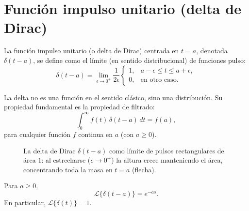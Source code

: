 \section{Función impulso unitario (delta de Dirac)}

\begin{definition}
La función impulso unitario (o delta de Dirac) centrada en $t=a$, denotada $\delta(t-a)$, se define como el límite (en sentido distribucional) de funciones pulso:
\[
\delta(t-a) = \lim_{\epsilon\to0^+} \frac{1}{2\epsilon}
\begin{cases}
1, & a-\epsilon \le t \le a+\epsilon,\\
0, & \text{en otro caso}.
\end{cases}
\]
\end{definition}

\begin{rem}
La delta no es una función en el sentido clásico, sino una distribución. Su propiedad fundamental es la propiedad de filtrado:
\[
\int_0^\infty f(t)\,\delta(t-a)\,dt = f(a),
\]
para cualquier función $f$ continua en $a$ (con $a\ge0$).
\end{rem}

\begin{figure}[!htbp]
\centering
{}
\caption{La delta de Dirac $\delta(t-a)$ como límite de pulsos rectangulares de área $1$: al estrecharse ($\epsilon\to0^+$) la altura crece manteniendo el área, concentrando toda la masa en $t=a$ (flecha).}
\label{fig:dirac}
\end{figure}

\begin{theorem}
Para $a\ge0$,
\[
\mathcal{L}\{\delta(t-a)\} = e^{-as}.
\]
En particular, $\mathcal{L}\{\delta(t)\} = 1$.
\end{theorem}

